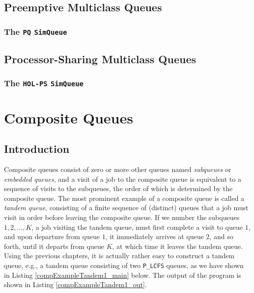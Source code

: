 \documentclass[12pt]{book}
\begin{document}
\section{Preemptive Multiclass Queues}

\subsection{The \lstinline{PQ} \lstinline{SimQueue}}

\section{Processor-Sharing Multiclass Queues}

\subsection{The \lstinline{HOL-PS} \lstinline{SimQueue}}

\chapter{Composite Queues}

\section{Introduction}

Composite queues consist of zero or more other queues
  named {\em subqueues\/} or {\em embedded queues},
  and a visit of a job to the composite queue is
  equivalent to a sequence of visits to the subqueues,
  the order of which is determined by the composite queue.
The most prominent example of a composite queue is called a {\em tandem queue\/},
  consisting of a finite sequence of (distinct) queues that a job must visit
  in order before leaving the composite queue.
If we number the subqueues $1, 2, \ldots, K$,
  a job visiting the tandem queue, must first complete
  a visit to queue $1$, and upon departure from queue $1$,
  it immediately arrives at queue $2$, and so forth,
  until it departs from queue $K$,
  at which time it leaves the tandem queue.
Using the previous chapters,
  it is actually rather easy to construct a tandem queue,
  e.g., a tandem queue consisting of two \lstinline|P_LCFS| queues,
  as we have shown in Listing \ref{compExampleTandem1_main} below.
The output of the program is shown in Listing \ref{compExampleTandem1_out}.
\end{document}
